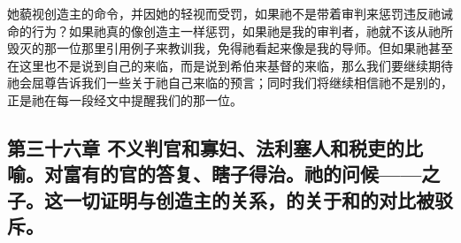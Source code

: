 她藐视创造主的命令，并因她的轻视而受罚，如果祂不是带着审判来惩罚违反祂诫命的行为？如果祂真的像创造主一样惩罚，如果祂是我的审判者，祂就不该从祂所毁灭的那一位那里引用例子来教训我，免得祂看起来像是我的导师。但如果祂甚至在这里也不是说到自己的来临，而是说到希伯来基督的来临，那么我们要继续期待祂会屈尊告诉我们一些关于祂自己来临的预言；同时我们将继续相信祂不是别的，正是祂在每一段经文中提醒我们的那一位。\newline{}\par


\subsection{第三十六章 不义判官和寡妇、法利塞人和税吏的比喻。对富有的官的答复、瞎子得治。祂的问候——之子。这一切证明与创造主的关系，的关于和的对比被驳斥。}

